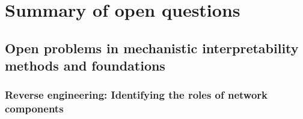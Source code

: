 \section{Summary of open questions}
\label{sec:summary-of-open-questions}

\subsection{Open problems in mechanistic interpretability methods and foundations}

\subsubsection{Reverse engineering: Identifying the roles of network components}


